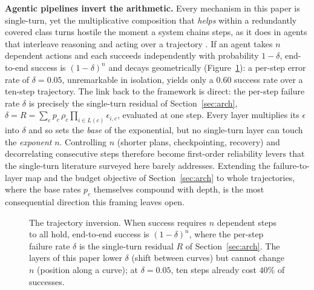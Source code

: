 \documentclass[11pt]{article}
\begin{document}
\textbf{Agentic pipelines invert the arithmetic.} Every mechanism in this paper
is single-turn, yet the multiplicative composition that \emph{helps} within a
redundantly covered class turns hostile the moment a system chains steps, as it
does in agents that interleave reasoning and acting over a trajectory
\citep{yao2023react}. If an agent takes $n$ dependent actions and each succeeds
independently with probability $1-\delta$, end-to-end success is $(1-\delta)^n$
and decays geometrically (Figure~\ref{fig:agentic}): a per-step error rate of
$\delta = 0.05$, unremarkable in isolation, yields only a $0.60$ success rate over
a ten-step trajectory. The link back to the framework is direct: the per-step
failure rate $\delta$ is precisely the single-turn residual of
Section~\ref{sec:arch}, $\delta = R = \sum_c p_c\, \rho_c \prod_{i \in L(c)}
\epsilon_{i,c}$, evaluated at one step. Every layer multiplies its $\epsilon$ into
$\delta$ and so sets the \emph{base} of the exponential, but no single-turn layer
can touch the \emph{exponent} $n$. Controlling $n$ (shorter plans, checkpointing,
recovery) and decorrelating consecutive steps therefore become first-order
reliability levers that the single-turn literature surveyed here barely addresses.
Extending the failure-to-layer map and the budget objective of
Section~\ref{sec:arch} to whole trajectories, where the base rates $p_c$
themselves compound with depth, is the most consequential direction this framing
leaves open.

\begin{figure}[t]
\centering
{}
\caption{The trajectory inversion. When success requires $n$ dependent steps to
all hold, end-to-end success is $(1-\delta)^n$, where the per-step failure rate
$\delta$ is the single-turn residual $R$ of Section~\ref{sec:arch}. The layers of
this paper lower $\delta$ (shift between curves) but cannot change $n$ (position
along a curve); at $\delta=0.05$, ten steps already cost $40\%$ of successes.}
\label{fig:agentic}
\end{figure}
\end{document}
